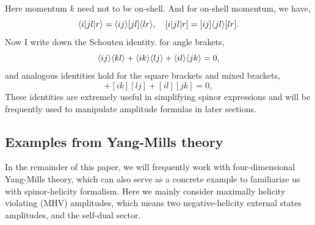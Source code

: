 \documentclass[a4paper,11pt]{article}
\begin{document}
Here momentum $k$ need not to be on-shell. And for on-shell momentum, we have,
\begin{equation}
    \langle i|jl|r \rangle=\langle ij \rangle[jl]\langle lr \rangle,\quad [i|jl|r]=[ij]\langle jl \rangle[lr].
\end{equation}
Now I write down the Schouten identity. for angle brakets,
\begin{equation}\label{Schouten-a}
    \langle ij \rangle\langle kl \rangle+\langle ik \rangle\langle lj \rangle+\langle il \rangle\langle jk \rangle=0,
\end{equation}
and analogous identities hold for the square brackets and mixed brackets,
\begin{equation}
    [ij][kl]+[ik][lj]+[il][jk]=0,
\end{equation}
These identities are extremely useful in simplifying spinor expressions and will be frequently used to manipulate amplitude formulas in later sections.\par

\subsection{Examples from Yang-Mills theory}
In the remainder of this paper, we will frequently work with four-dimensional Yang-Mills theory, 
which can also serve as a concrete example to familiarize us with spinor-helicity formalism. Here we mainly consider maximally helicity violating (MHV) amplitudes, 
which means two negative-helicity external states amplitudes, and the self-dual sector.\par
\end{document}
